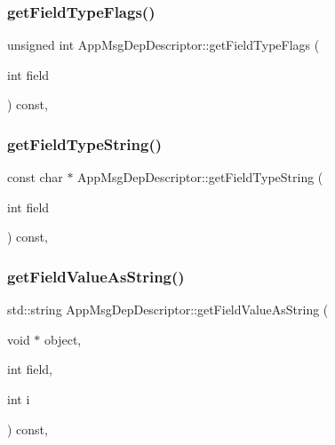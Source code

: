 \subsubsection{\texorpdfstring{get\+Field\+Type\+Flags()}{getFieldTypeFlags()}}
{\footnotesize\ttfamily unsigned int App\+Msg\+Dep\+Descriptor\+::get\+Field\+Type\+Flags (\begin{DoxyParamCaption}\item[{int}]{field }\end{DoxyParamCaption}) const\hspace{0.3cm}{\ttfamily [override]}, {\ttfamily [virtual]}}

\mbox{\label{class_app_msg_dep_descriptor_a376972c07aabb5b32e12a38649a56aaf}} 
\subsubsection{\texorpdfstring{get\+Field\+Type\+String()}{getFieldTypeString()}}
{\footnotesize\ttfamily const char $\ast$ App\+Msg\+Dep\+Descriptor\+::get\+Field\+Type\+String (\begin{DoxyParamCaption}\item[{int}]{field }\end{DoxyParamCaption}) const\hspace{0.3cm}{\ttfamily [override]}, {\ttfamily [virtual]}}

\mbox{\label{class_app_msg_dep_descriptor_a83fabb429ce26b55eed23aebe202570d}} 
\subsubsection{\texorpdfstring{get\+Field\+Value\+As\+String()}{getFieldValueAsString()}}
{\footnotesize\ttfamily std\+::string App\+Msg\+Dep\+Descriptor\+::get\+Field\+Value\+As\+String (\begin{DoxyParamCaption}\item[{void $\ast$}]{object,  }\item[{int}]{field,  }\item[{int}]{i }\end{DoxyParamCaption}) const\hspace{0.3cm}{\ttfamily [override]}, {\ttfamily [virtual]}}


